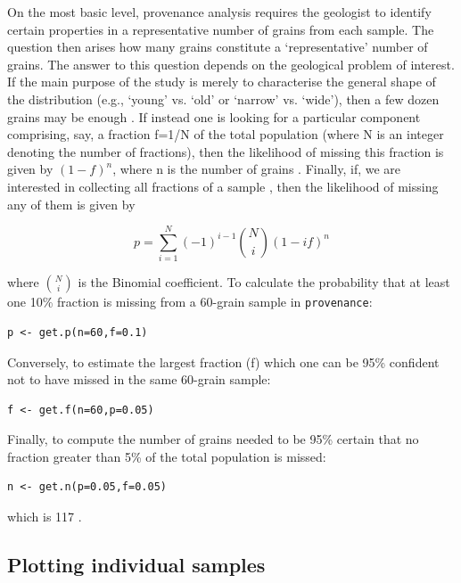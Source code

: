\documentclass{article}
\begin{document}
On the most basic level, provenance analysis requires the geologist to
identify certain properties in a representative number of grains from
each sample. The question then arises how many grains constitute a
`representative' number of grains. The answer to this question depends
on the geological problem of interest. If the main purpose of the
study is merely to characterise the general shape of the distribution
(e.g., `young' vs. `old' or `narrow' vs. `wide'), then a few dozen
grains may be enough \citep{avdeev2011}. If instead one is looking for
a particular component comprising, say, a fraction f=1/N of the total
population (where N is an integer denoting the number of fractions),
then the likelihood of missing this fraction is given by $(1-f)^n$,
where n is the number of grains \citep{dodson1988}. Finally, if, we
are interested in collecting all fractions of a sample
\citep{vermeesch2004b}, then the likelihood of missing any of them is
given by

\begin{equation}
p = \sum\limits_{i=1}^{N}(-1)^{i-1}{N \choose i}(1-if)^n
\end{equation}

where ${N \choose i}$ is the Binomial coefficient.  To calculate the
probability that at least one 10\% fraction is missing from a 60-grain
sample in {\tt provenance}:

\begin{verbatim}
p <- get.p(n=60,f=0.1)
\end{verbatim}

Conversely, to estimate the largest fraction (f) which one can be 95\%
confident not to have missed in the same 60-grain sample:

\begin{verbatim}
f <- get.f(n=60,p=0.05)
\end{verbatim}

Finally, to compute the number of grains needed to be 95\% certain
that no fraction greater than 5\% of the total population is missed:

\begin{verbatim}
n <- get.n(p=0.05,f=0.05)
\end{verbatim}

which is 117 \citep{vermeesch2004b}.

\subsection{Plotting individual samples}
\label{sec:plotting}
\end{document}
